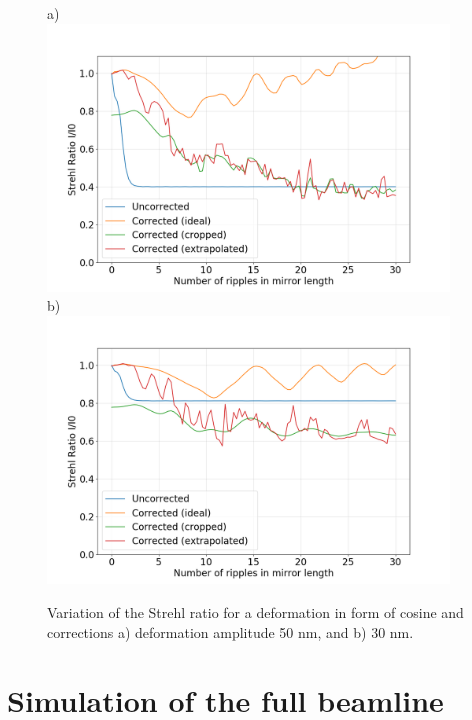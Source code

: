 \documentclass{iucr}              %
\begin{document}
  \begin{figure}
  \label{fig:strehlRatioCosine} 
  \begin{flushleft}
  a)\\
  \includegraphics[width=0.95\textwidth]{figures/scan_peak_vs_cos50.png} \\
  b)\\
  \includegraphics[width=0.95\textwidth]{figures/scan_peak_vs_cos30.png} \\
  \end{flushleft}

  \caption
  {
Variation of the Strehl ratio for a deformation in form of cosine and corrections a) deformation amplitude 50 nm, and b) 30 nm.
}
  \end{figure} 
  
  


\section{Simulation of the full beamline}
\end{document}
